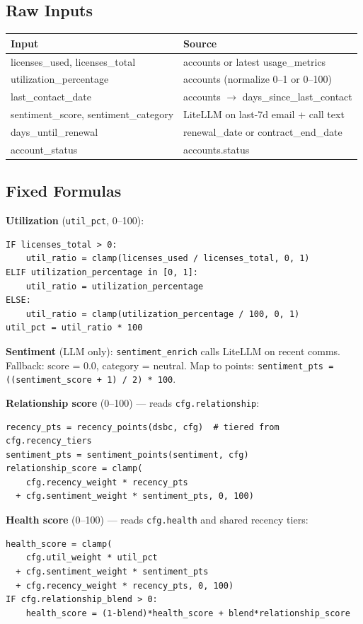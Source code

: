 \documentclass[11pt,a4paper]{article}
\begin{document}
\subsection{Raw Inputs}

\begin{longtable}{@{}p{4cm}p{8cm}@{}}
\toprule
\textbf{Input} & \textbf{Source} \\
\midrule
\endhead
licenses\_used, licenses\_total & accounts or latest usage\_metrics \\
utilization\_percentage & accounts (normalize 0--1 or 0--100) \\
last\_contact\_date & accounts $\rightarrow$ days\_since\_last\_contact \\
sentiment\_score, sentiment\_category & LiteLLM on last-7d email + call text \\
days\_until\_renewal & renewal\_date or contract\_end\_date \\
account\_status & accounts.status \\
\bottomrule
\end{longtable}

\subsection{Fixed Formulas}

\textbf{Utilization} (\texttt{util\_pct}, 0--100):
\begin{lstlisting}
IF licenses_total > 0:
    util_ratio = clamp(licenses_used / licenses_total, 0, 1)
ELIF utilization_percentage in [0, 1]:
    util_ratio = utilization_percentage
ELSE:
    util_ratio = clamp(utilization_percentage / 100, 0, 1)
util_pct = util_ratio * 100
\end{lstlisting}

\textbf{Sentiment} (LLM only): \texttt{sentiment\_enrich} calls LiteLLM on recent comms. Fallback: score = 0.0, category = neutral. Map to points: \texttt{sentiment\_pts = ((sentiment\_score + 1) / 2) * 100}.

\textbf{Relationship score} (0--100) --- reads \texttt{cfg.relationship}:
\begin{lstlisting}
recency_pts = recency_points(dsbc, cfg)  # tiered from cfg.recency_tiers
sentiment_pts = sentiment_points(sentiment, cfg)
relationship_score = clamp(
    cfg.recency_weight * recency_pts
  + cfg.sentiment_weight * sentiment_pts, 0, 100)
\end{lstlisting}

\textbf{Health score} (0--100) --- reads \texttt{cfg.health} and shared recency tiers:
\begin{lstlisting}
health_score = clamp(
    cfg.util_weight * util_pct
  + cfg.sentiment_weight * sentiment_pts
  + cfg.recency_weight * recency_pts, 0, 100)
IF cfg.relationship_blend > 0:
    health_score = (1-blend)*health_score + blend*relationship_score
\end{lstlisting}
\end{document}
